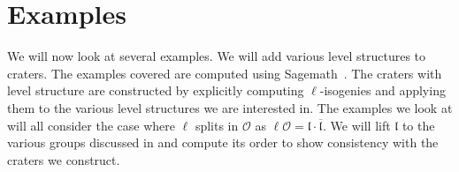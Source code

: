 \documentclass[11pt,a4paper]{amsart}
\theoremstyle{plain}
\theoremstyle{definition}
\theoremstyle{remark}
\begin{document}
\section{Examples}\label{sec:examples}
We will now look at several examples. We will add various level structures to craters. The examples covered are computed using Sagemath~\cite{sage}. The craters with level structure are constructed by explicitly computing $\ell$-isogenies and applying them to the various level structures we are interested in. The examples we look at will all consider the case where $\ell$ splits in $\mathcal{O}$ as $\ell\mathcal{O} = \mathfrak{l}\cdot\overline{\mathfrak{l}}.$ We will lift $\mathfrak{l}$ to the various groups discussed in  and compute its order to show consistency with the craters we construct.
\end{document}
